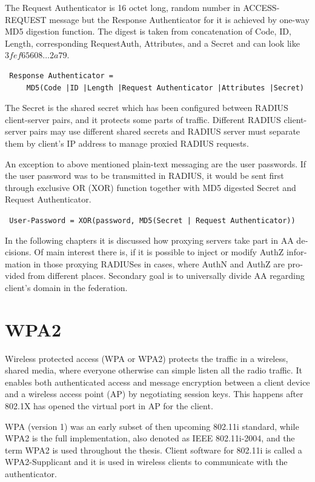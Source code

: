 \documentclass[12pt,a4paper,english]{tutthesis}
\begin{document}
\begin{otherlanguage}{english}
The Request Authenticator is 16 octet long, random number in
ACCESS-REQUEST message but the Response Authenticator for it is achieved
by one-way MD5 digestion function. 
The digest is taken from concatenation of Code, ID, Length, corresponding
Request\-Auth, Attributes, and a Secret and can look like 
$3fef65608\ldots 2a79$. 
\begin{verbatim}
 Response Authenticator = 
     MD5(Code |ID |Length |Request Authenticator |Attributes |Secret)
\end{verbatim}
The Secret is the shared secret which has been configured between
RADIUS client-server pairs,
and it protects some parts of traffic. 
Different RADIUS client-server pairs may use different
shared secrets and RADIUS server must separate them by client's IP address to
manage proxied RADIUS requests\cite{radiusbook}.

An exception to above mentioned plain-text messaging are the user passwords.
If the user password was to be transmitted in RADIUS, it would be sent first
through exclusive OR (XOR) function together with MD5 digested Secret
and Request Authenticator.
\begin{center}
{\tt 
User-Password = XOR(password, MD5(Secret | Request Authenticator))}
\end{center}




In the following chapters it is discussed how proxying servers take 
part in AA decisions. Of main interest there is, if it is possible 
to inject or modify AuthZ information in those proxying RADIUSes in
cases, where AuthN and AuthZ are provided from different
 places\cite{rfc2607}. Secondary goal is to universally divide AA regarding 
client's domain in the federation.




\section{WPA2}
\label{sec-2-3}

Wireless protected access (WPA or WPA2) protects the traffic in a wireless,
shared media, where everyone otherwise can simple listen all the radio traffic.
It enables both authenticated access and message
encryption between a client device and  a wireless access point (AP)
by negotiating session keys. This happens 
after 802.1X has opened the virtual port in AP for the client.

WPA (version 1)  was an early subset of then upcoming 802.11i standard,
while WPA2 is the full implementation, also denoted as IEEE
802.11i-2004, and the term WPA2 is used throughout the thesis.
Client software for 802.11i is called a WPA2-Supplicant and it is used
in wireless clients to communicate with the authenticator. 


\end{otherlanguage}
\end{document}
